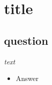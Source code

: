 \documentclass{article}
\begin{document}
\setcounter{section}{1}
\section{title}

\subsection{question}
\textit{text}
\begin{itemize}
\item Answer
\end{itemize}
\end{document}

